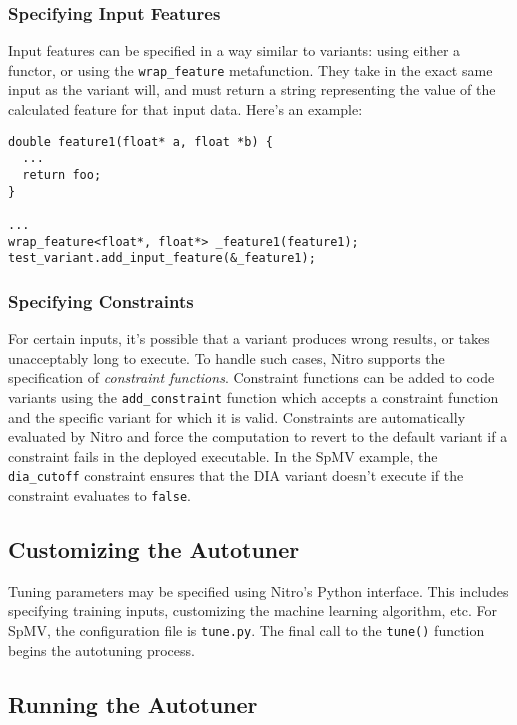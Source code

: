 \documentclass[12pt]{article}
\begin{document}
\subsubsection{Specifying Input Features}
Input features can be specified in a way similar to variants: using either a functor, or
using the \texttt{wrap\_feature} metafunction. They take in the exact same input as the
variant will, and must return a string representing the value of the calculated
feature for that input data. Here's an example:

\begin{verbatim}
double feature1(float* a, float *b) {
  ...
  return foo;
}

...
wrap_feature<float*, float*> _feature1(feature1);
test_variant.add_input_feature(&_feature1);
\end{verbatim}

\subsubsection{Specifying Constraints}

For certain inputs, it's possible that a variant produces wrong results, or takes
unacceptably long to execute. To handle such cases, Nitro supports the specification
of \emph{constraint functions}.
Constraint functions can be added to code variants using the
\texttt{add\_constraint} function which accepts a constraint function and the specific variant for which it is valid.
Constraints are automatically evaluated by Nitro and force the computation to revert to
the default variant if a constraint fails in the deployed executable.
In the SpMV example, the \texttt{dia\_cutoff} constraint ensures that
the DIA variant doesn't execute if the constraint evaluates to \texttt{false}.

\subsection{Customizing the Autotuner}
\label{sec:tunepy}

Tuning parameters may be specified using Nitro's Python interface. This includes
specifying training inputs, customizing the machine learning algorithm, etc.
For SpMV, the configuration file is \texttt{tune.py}. The final call to
the \texttt{tune()} function begins the autotuning process.

\subsection{Running the Autotuner}
\end{document}
